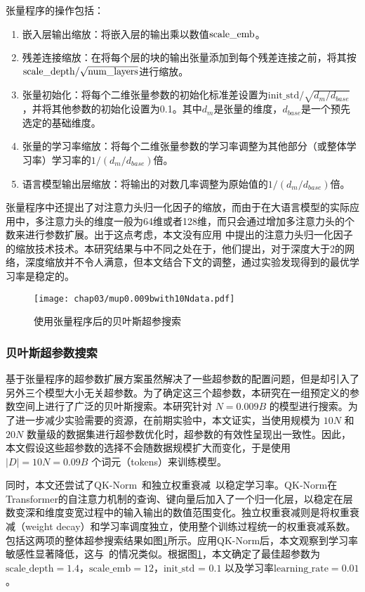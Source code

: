 张量程序的操作包括：
\begin{enumerate}
  \item 嵌入层输出缩放：将嵌入层的输出乘以数值$\text{scale\_\text{emb}}$。
  \item 残差连接缩放：在将每个层的块的输出张量添加到每个残差连接之前，将其按$\text{scale\_\text{depth}}/\sqrt{\text{num\_layers}}$进行缩放。
  \item 张量初始化：将每个二维张量参数的初始化标准差设置为$\text{init\_std}/\sqrt{d_m/d_{base}}$，并将其他参数的初始化设置为0.1。其中$d_m$是张量的维度，$d_{base}$是一个预先选定的基础维度。
  \item 张量的学习率缩放：将每个二维张量参数的学习率调整为其他部分（或整体学习率）学习率的$1/({d_m/d_{base}})$倍。
  \item 语言模型输出层缩放：将输出的对数几率调整为原始值的$1/(d_m/d_{base})$倍。
\end{enumerate}

张量程序中还提出了对注意力头归一化因子的缩放，而由于在大语言模型的实际应用中，多注意力头的维度一般为64维或者128维，而只会通过增加多注意力头的个数来进行参数扩展。出于这点考虑，本文没有应用\citet{yang2022tensor} 中提出的注意力头归一化因子的缩放技术技术。本研究结果与\citet{yang2023tensor}中不同之处在于，他们提出，对于深度大于2的网络，深度缩放并不令人满意，但本文结合下文的调整，通过实验发现得到的最优学习率是稳定的。

\begin{figure}[htbp]
  \centering
  \texttt{[image: chap03/mup0.009bwith10Ndata.pdf]}
  \caption{使用张量程序后的贝叶斯超参搜索}
  \label{fig:mupsearch_app}
\end{figure}

\subsubsection{贝叶斯超参数搜索}
基于张量程序的超参数扩展方案虽然解决了一些超参数的配置问题，但是却引入了另外三个模型大小无关超参数。为了确定这三个超参数，本研究在一组预定义的参数空间上进行了广泛的贝叶斯搜索。本研究针对 $N = 0.009B$ 的模型进行搜索。为了进一步减少实验需要的资源，在前期实验中，本文证实，当使用规模为 $10N$ 和 $20N$ 数量级的数据集进行超参数优化时，超参数的有效性呈现出一致性。因此，本文假设这些超参数的选择不会随数据规模扩大而变化，于是使用 $|D| = 10N = 0.09B$ 个词元（tokens）来训练模型。

同时，本文还尝试了QK-Norm~\citep{henry-etal-2020-query}和独立权重衰减~\citep{loshchilov2017decoupled}以稳定学习率。QK-Norm在Transformer的自注意力机制的查询、键向量后加入了一个归一化层，以稳定在层数变深和维度变宽过程中的输入输出的数值范围变化。独立权重衰减则是将权重衰减（weight decay）和学习率调度独立，使用整个训练过程统一的权重衰减系数。包括这两项的整体超参搜索结果如图\ref{fig:mupsearch_app}所示。应用QK-Norm后，本文观察到学习率敏感性显著降低，这与~\citet{wortsman2023small}的情况类似。根据图\ref{fig:mupsearch_app}，本文确定了最佳超参数为 $\text{scale\_depth} = 1.4$，$\text{scale\_emb} = 12$，$\text{init\_std = 0.1}$ 以及学习率$\text{learning\_rate} = 0.01$。



